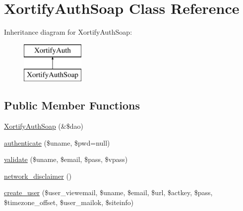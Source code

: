 \hypertarget{class_xortify_auth_soap}{\section{Xortify\-Auth\-Soap Class Reference}
\label{class_xortify_auth_soap}
}
Inheritance diagram for Xortify\-Auth\-Soap\-:\begin{figure}[H]
\begin{center}
\leavevmode
\includegraphics[height=2.000000cm]{class_xortify_auth_soap}
\end{center}
\end{figure}
\subsection*{Public Member Functions}
\begin{DoxyCompactItemize}
\item 
\hyperlink{class_xortify_auth_soap_a727c5881917f4658db908b8c08cb3423}{Xortify\-Auth\-Soap} (\&\$dao)
\item 
\hyperlink{class_xortify_auth_soap_a9993458c5cc054b459fd41454667bfd3}{authenticate} (\$uname, \$pwd=null)
\item 
\hyperlink{class_xortify_auth_soap_a7c6d6225c96945b8c9af09db6cbbd4ad}{validate} (\$uname, \$email, \$pass, \$vpass)
\item 
\hyperlink{class_xortify_auth_soap_a8c0109e54e3e53fe911a3124c3ac44b7}{network\-\_\-disclaimer} ()
\item 
\hyperlink{class_xortify_auth_soap_a419c2f9032a828116ed88412ea35d95a}{create\-\_\-user} (\$user\-\_\-viewemail, \$uname, \$email, \$url, \$actkey, \$pass, \$timezone\-\_\-offset, \$user\-\_\-mailok, \$siteinfo)
\end{DoxyCompactItemize}

